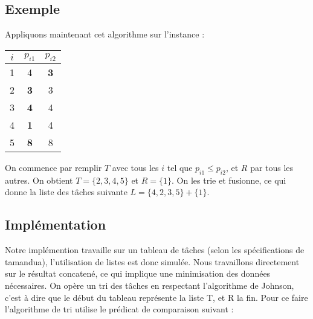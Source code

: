 \subsection{Exemple}
Appliquons maintenant cet algorithme sur l'instance :

\begin{center}
\begin{tabular}{|c|c|c|}
\hline
$i$ & $p_{i1}$ & $p_{i2}$ \\
\hline
1 & 4 & \textbf{3} \\
\hline
2 & \textbf{3} & 3 \\
\hline
3 & \textbf{4} & 4 \\
\hline
4 & \textbf{1} & 4 \\
\hline
5 & \textbf{8} & 8 \\
\hline
\end{tabular}
\end{center}

On commence par remplir $T$ avec tous les $i$ tel que $p_{i1} \le p_{i2}$, et
$R$ par tous les autres.
On obtient $T = \{2,3,4,5\}$ et $R = \{1\}$.
On les trie et fusionne, ce qui donne la liste des tâches 
suivante $L = \{4,2,3,5\} + \{1\}$.

\subsection{Implémentation}
Notre implémention travaille sur un tableau de tâches (selon les spécifications de
tamandua), l'utilisation de listes est donc simulée.
Nous travaillons directement sur le résultat concatené, ce qui implique une
minimisation des données nécessaires. On opère un tri des tâches en respectant
l'algorithme de Johnson, c'est à dire que le début du tableau représente la liste T,
et R la fin. Pour ce faire l'algorithme de tri utilise le prédicat de
comparaison suivant :


